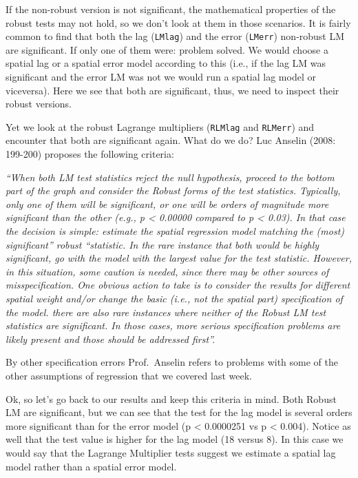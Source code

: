\documentclass[]{book}
\begin{document}
If the non-robust version is not significant, the mathematical properties of the robust tests may not hold, so we don't look at them in those scenarios. It is fairly common to find that both the lag (\texttt{LMlag}) and the error (\texttt{LMerr}) non-robust LM are significant. If only one of them were: problem solved. We would choose a spatial lag or a spatial error model according to this (i.e., if the lag LM was significant and the error LM was not we would run a spatial lag model or viceversa). Here we see that both are significant, thus, we need to inspect their robust versions.

Yet we look at the robust Lagrange multipliers (\texttt{RLMlag} and \texttt{RLMerr}) and encounter that both are significant again. What do we do? Luc Anselin (2008: 199-200) proposes the following criteria:

\emph{``When both LM test statistics reject the null hypothesis, proceed to the bottom part of the graph and consider the Robust forms of the test statistics. Typically, only one of them will be significant, or one will be orders of magnitude more significant than the other (e.g., p \textless{} 0.00000 compared to p \textless{} 0.03). In that case the decision is simple: estimate the spatial regression model matching the (most) significant'' robust ``statistic. In the rare instance that both would be highly significant, go with the model with the largest value for the test statistic. However, in this situation, some caution is needed, since there may be other sources of misspecification. One obvious action to take is to consider the results for different spatial weight and/or change the basic (i.e., not the spatial part) specification of the model. there are also rare instances where neither of the Robust LM test statistics are significant. In those cases, more serious specification problems are likely present and those should be addressed first''.}

By other specification errors Prof.~Anselin refers to problems with some of the other assumptions of regression that we covered last week.

Ok, so let's go back to our results and keep this criteria in mind. Both Robust LM are significant, but we can see that the test for the lag model is several orders more significant than for the error model (p \textless{} 0.0000251 vs p \textless{} 0.004). Notice as well that the test value is higher for the lag model (18 versus 8). In this case we would say that the Lagrange Multiplier tests suggest we estimate a spatial lag model rather than a spatial error model.
\end{document}
